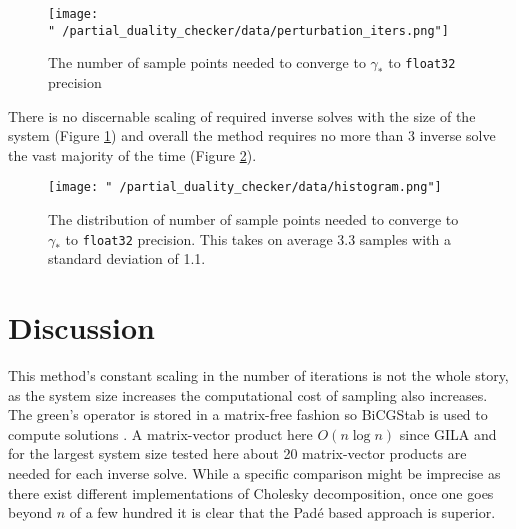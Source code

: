 \documentclass[twocolumn]{revtex4-2}
\begin{document}
\begin{figure}[H]
\texttt{[image: "~/partial\_duality\_checker/data/perturbation\_iters.png"]}
\caption{The number of sample points needed to converge to $\gamma_*$ to \texttt{float32} precision}
\label{fig:scaling}
\end{figure}
There is no discernable scaling of required inverse solves with the size of the system (Figure \ref{fig:scaling}) and overall the method requires no more than 3 inverse solve the vast majority of the time (Figure \ref{fig:distribution}).

\begin{figure}[H]
\texttt{[image: "~/partial\_duality\_checker/data/histogram.png"]}
\caption{The distribution of number of sample points needed to converge to $\gamma_*$ to \texttt{float32} precision. This takes on average 3.3 samples with a standard deviation of 1.1.}
\label{fig:distribution}
\end{figure}

\section{Discussion}
This method's constant scaling in the number of iterations is not the whole story, as the system size increases the computational cost of sampling also increases.  The green's operator is stored in a matrix-free fashion so BiCGStab is used to compute solutions \cite{van1992bi}. A matrix-vector product here $O(n\log n)$ since GILA and for the largest system size tested here about 20 matrix-vector products are needed for each inverse solve. While a specific comparison might be imprecise as there exist different implementations of Cholesky decomposition, once one goes beyond $n$ of a few hundred it is clear that the Padé based approach is superior.


\end{document}
